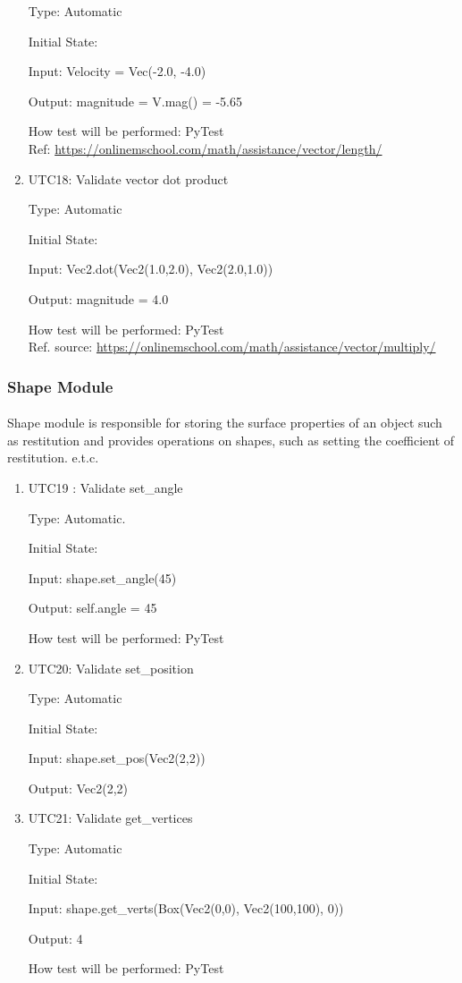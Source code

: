 \documentclass[12pt, titlepage]{article}
\begin{document}
\begin{enumerate}
	Type: Automatic
	
	Initial State: 
	
	Input: Velocity = Vec(-2.0, -4.0)
	
	Output: magnitude = V.mag() = -5.65
	
	How test will be performed: PyTest\\
	Ref: \url{https://onlinemschool.com/math/assistance/vector/length/}
	\item{UTC18}{: Validate vector dot product\\}
	
	Type: Automatic
	
	Initial State: 
	
	Input: Vec2.dot(Vec2(1.0,2.0), Vec2(2.0,1.0))
	
	Output: magnitude = 4.0
	
	How test will be performed: PyTest\\
	Ref. source: \url{https://onlinemschool.com/math/assistance/vector/multiply/}
	
	
\end{enumerate}

\subsubsection{Shape Module}

\paragraph{}
Shape module is responsible for storing the surface properties of an object such as restitution and provides operations on shapes, such as setting the coefficient of restitution. e.t.c.
\begin{enumerate}
	
	
	\item{UTC19} {: Validate set\_angle \\}
	
	Type: Automatic.
	
	Initial State: 
	
	Input: shape.set\_angle(45)
	
	Output: self.angle = 45
	
	How test will be performed: PyTest 
	
	\item{UTC20}{: Validate set\_position\\}
	
	Type: Automatic
	
	Initial State: 
	
	Input: shape.set\_pos(Vec2(2,2))
	
	Output: Vec2(2,2)
	
	\item{UTC21}{: Validate get\_vertices\\}
	
	Type: Automatic
	
	Initial State: 
	
	Input: shape.get\_verts(Box(Vec2(0,0), Vec2(100,100), 0)) 
	
	Output: 4
	
	How test will be performed: PyTest
	

\end{enumerate}
\end{document}
